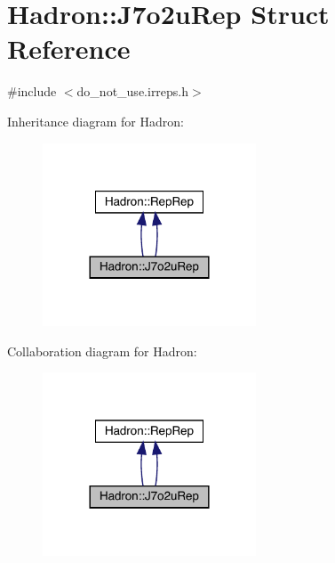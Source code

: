\hypertarget{structHadron_1_1J7o2uRep}{}\section{Hadron\+:\+:J7o2u\+Rep Struct Reference}
\label{structHadron_1_1J7o2uRep}


{\ttfamily \#include $<$do\+\_\+not\+\_\+use.\+irreps.\+h$>$}



Inheritance diagram for Hadron\+:
\nopagebreak
\begin{figure}[H]
\begin{center}
\leavevmode
\includegraphics[width=180pt]{dd/d5e/structHadron_1_1J7o2uRep__inherit__graph}
\end{center}
\end{figure}


Collaboration diagram for Hadron\+:
\nopagebreak
\begin{figure}[H]
\begin{center}
\leavevmode
\includegraphics[width=180pt]{d0/db4/structHadron_1_1J7o2uRep__coll__graph}
\end{center}
\end{figure}
